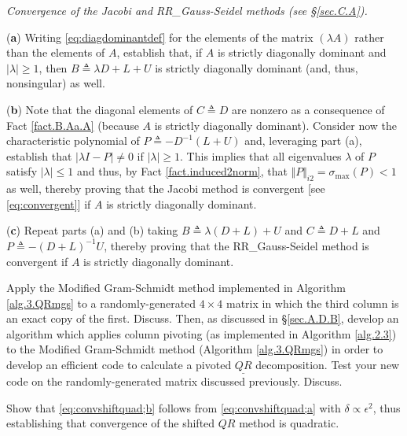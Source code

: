 \begin{exercise} \label{ex.4.Jacobi.RR_Gauss-Seidel} \rm {\it Convergence of the Jacobi and RR_Gauss-Seidel methods (see \S \ref{sec.C.A}).}\vskip0.05in

\noindent ({\bf a}) Writing \eqref{eq:diagdominantdef} for the elements of the matrix $(\lambda A)$ rather than the elements of $A$,
establish that, if $A$ is strictly diagonally dominant and
$|\lambda|\ge 1$, then $B\triangleq \lambda D+L+U$ is strictly diagonally dominant (and, thus, nonsingular) as well.\vskip0.1in

\noindent ({\bf b}) Note that the diagonal elements of $C\triangleq D$ are nonzero as a consequence of Fact \ref{fact.B.Aa.A} (because $A$ is strictly diagonally dominant).
Consider now the characteristic polynomial of $P\triangleq -D^{-1}(L+U)$ and, leveraging part (a), establish that $|\lambda I - P|\ne 0$ if $|\lambda|\ge 1$.  This implies that all eigenvalues
$\lambda$ of $P$ satisfy $|\lambda|\le 1$ and thus, by Fact \ref{fact.induced2norm}, that $\Vert P\Vert_{i2} = \sigma_{\textrm{max}}(P)<1$ as well,
thereby proving that the Jacobi method is convergent [see \eqref{eq:convergent}] if $A$ is strictly diagonally dominant.\vskip0.1in

\noindent ({\bf c}) Repeat parts (a) and (b) taking $B\triangleq \lambda (D+L)+U$ and $C\triangleq D+L$ and $P\triangleq -(D+L)^{-1} U$,
thereby proving that the RR_Gauss-Seidel method is convergent if $A$ is strictly diagonally dominant.
\end{exercise}

\begin{exercise} \label{ex:04.QRmgspivot} \rm Apply the Modified Gram-Schmidt method implemented in Algorithm \ref{alg.3.QRmgs} to a randomly-generated $4\times 4$ matrix in which the third column is an exact copy of the first.  Discuss.
Then, as discussed in \S \ref{sec.A.D.B}, develop an algorithm which applies column pivoting (as implemented in Algorithm \ref{alg.2.3}) to the Modified Gram-Schmidt method (Algorithm \ref{alg.3.QRmgs})
in order to develop an efficient code to calculate a pivoted $\underline{QR}$ decomposition.  Test your new code on the randomly-generated matrix discussed previously.  Discuss.
\end{exercise}

\begin{exercise} \label{ex:04.convshiftquad} \rm Show that \eqref{eq:convshiftquad;b} follows from \eqref{eq:convshiftquad;a} with $\delta \propto \epsilon^2$,
thus establishing that convergence of the shifted $QR$ method is quadratic.
\end{exercise}

